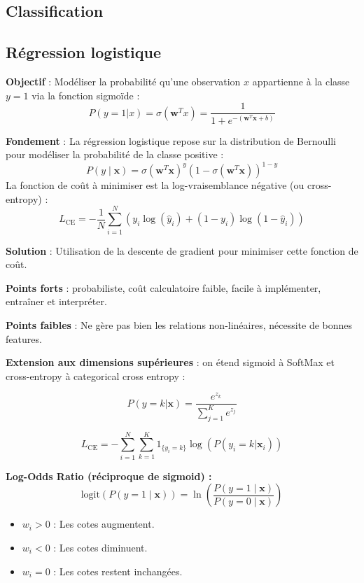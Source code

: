 \documentclass[a4paper,portrait]{article}
\begin{document}
\begin{multicols}{2}
\newpage

\section{Classification}
\subsection{Régression logistique}

\textbf{Objectif} : Modéliser la probabilité qu'une observation \( x \) appartienne à la classe \( y = 1 \) via la fonction sigmoïde :
\[
P(y = 1 | x) = \sigma(\mathbf{w}^Tx)=\frac{1}{1 + e^{-(\mathbf{w}^T \mathbf{x} + b)}}
\]

\textbf{Fondement} : La régression logistique repose sur la distribution de Bernoulli pour modéliser la probabilité de la classe positive :
\[
P(y \mid \mathbf{x}) = \sigma(\mathbf{w}^T \mathbf{x})^y (1 - \sigma(\mathbf{w}^T \mathbf{x}))^{1-y}
\]
La fonction de coût à minimiser est la log-vraisemblance négative (ou cross-entropy) :
\[
L_{\text{CE}} = - \frac{1}{N} \sum_{i=1}^{N} \left( y_i \log(\hat{y}_i) + (1 - y_i) \log(1 - \hat{y}_i) \right)
\]

\textbf{Solution} : Utilisation de la descente de gradient pour minimiser cette fonction de coût.

\textbf{Points forts} : probabiliste, coût calculatoire faible, facile à implémenter, entraîner et interpréter.

\textbf{Points faibles} : Ne gère pas bien les relations non-linéaires, nécessite de bonnes features.

\textbf{Extension aux dimensions supérieures} : on étend sigmoid à SoftMax et cross-entropy à categorical cross entropy :

\[P(y = k | \mathbf{x}) = \frac{e^{z_k}}{\sum_{j=1}^K e^{z_j}}\]

\[L_{\text{CE}} = - \sum_{i=1}^N \sum_{k=1}^K 1_{\{y_i = k\}} \log(P(y_i = k | \mathbf{x}_i))\]

\textbf{Log-Odds Ratio (réciproque de sigmoid) : }
\[
\text{logit}(P(y=1 \mid \mathbf{x})) = \ln\left(\frac{P(y=1 \mid \mathbf{x})}{P(y=0 \mid \mathbf{x})}\right)
\]

\begin{itemize}
    \item \( w_i > 0 \) : Les cotes augmentent.
    \item \( w_i < 0 \) : Les cotes diminuent.
    \item \( w_i = 0 \) : Les cotes restent inchangées.
\end{itemize}


\end{multicols}
\end{document}
